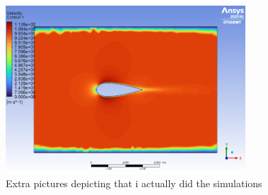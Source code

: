 \documentclass[12pt,a4paper]{article}
\begin{document}
\begin{figure}[H]
\centering
\includegraphics[width=0.8\textwidth]{image13.png}
\caption{Extra pictures depicting that i actually did the simulations}
\label{fig:asset4}
\end{figure}
\end{document}
